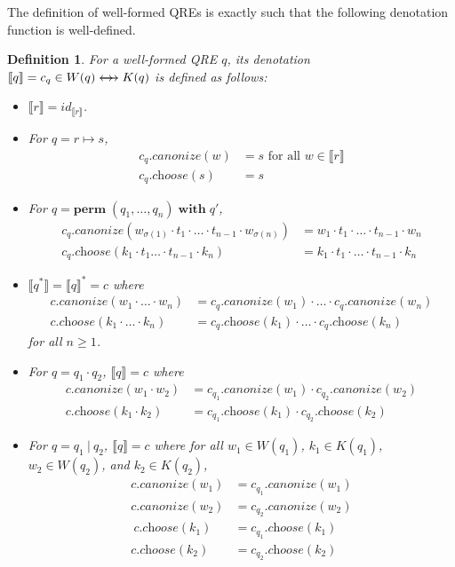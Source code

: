 \documentclass[a4paper,11pt] {article}
\theoremstyle{plain}
\newtheorem{definition}[theorem]{Definition}
\newcommand{\negjoinrel}{\mathrel{\mkern3mu}}
\newcommand{\rlaprel}[1]{\mathrel{\mathrlap{#1}}}
\newcommand{\lcanonize}[1]{\textit{$#1$.canonize}}
\newcommand{\lchoose}[1]{\textit{$#1$.choose}}
\newcommand{\canon}{\rlaprel{\longleftarrow}\rlaprel{\longrightarrow}
  \negjoinrel\rightarrow\;\,}
\newcommand{\perm}{ \textbf{perm}\; }
\newcommand{\with}{ \;\textbf{with}\; }
\begin{document}
The definition of well-formed QREs is exactly such that the following
denotation function is well-defined.
\begin{definition}
  For a well-formed QRE $q$, its denotation
  $\llbracket q \rrbracket = c_q \in W(q) \canon K(q)$ is defined as follows:
  \begin{itemize}
  \item $\llbracket r \rrbracket = \mathit{id}_{\llbracket r \rrbracket}$.
  \item For $q = r \mapsto s$, 
    \begin{align*}
      \lcanonize{c_q}(w) &= s \text{ for all
        $w \in \llbracket r \rrbracket$} \\
      \lchoose{c_q}(s) &= s
    \end{align*}
  \item For $q = \perm(q_1, \ldots, q_n) \with q'$, 
    \begin{align*}
      \lcanonize{c_q}(w_{\sigma(1)} \cdot t_1 \cdot \ldots \cdot t_{n-1}
      \cdot w_{\sigma(n)}) &= w_1 \cdot t_1 \cdot \ldots \cdot t_{n-1} \cdot w_n \\
      \lchoose{c_q}(k_1 \cdot t_1 \ldots \cdot t_{n-1} \cdot k_n)
      &= k_1 \cdot t_1 \cdot \ldots \cdot t_{n-1} \cdot k_n
    \end{align*}
  \item $\llbracket q^* \rrbracket = \llbracket q \rrbracket^* = c$ where 
    \begin{align*}
      \lcanonize{c}(w_1 \cdot \ldots \cdot w_n) &=
      \lcanonize{c_q}(w_1) \cdot \ldots \cdot
      \lcanonize{c_q}(w_n) \\
      \lchoose{c}(k_1 \cdot \ldots \cdot k_n) &=
      \lchoose{c_q}(k_1) \cdot \ldots \cdot
      \lchoose{c_q}(k_n)
    \end{align*}
    for all $n \geq 1$.
  \item For $q = q_1 \cdot q_2$, $\llbracket q \rrbracket = c$ where 
    \begin{align*}
      \lcanonize{c}(w_1 \cdot w_2) &=
      \lcanonize{c_{q_1}}(w_1) \cdot
      \lcanonize{c_{q_2}}(w_2) \\
      \lchoose{c}(k_1 \cdot k_2) &=
      \lchoose{c_{q_1}}(k_1) \cdot
      \lchoose{c_{q_2}}(k_2)
    \end{align*}
  \item For $q = q_1 ~|~ q_2$, $\llbracket q \rrbracket = c$ where
    for all $w_1 \in W(q_1)$, $k_1 \in K(q_1)$, $w_2 \in W(q_2)$,
    and $k_2 \in K(q_2)$,
    \begin{align*}
      \lcanonize{c}(w_1) &=
      \lcanonize{c_{q_1}}(w_1) \\
      \lcanonize{c}(w_2) &=
      \lcanonize{c_{q_2}}(w_2) \\
      \
      \lchoose{c}(k_1) &=
      \lchoose{c_{q_1}}(k_1) \\      
      \lchoose{c}(k_2) &=
      \lchoose{c_{q_2}}(k_2)
    \end{align*}
  \end{itemize}  
\end{definition}
\end{document}
